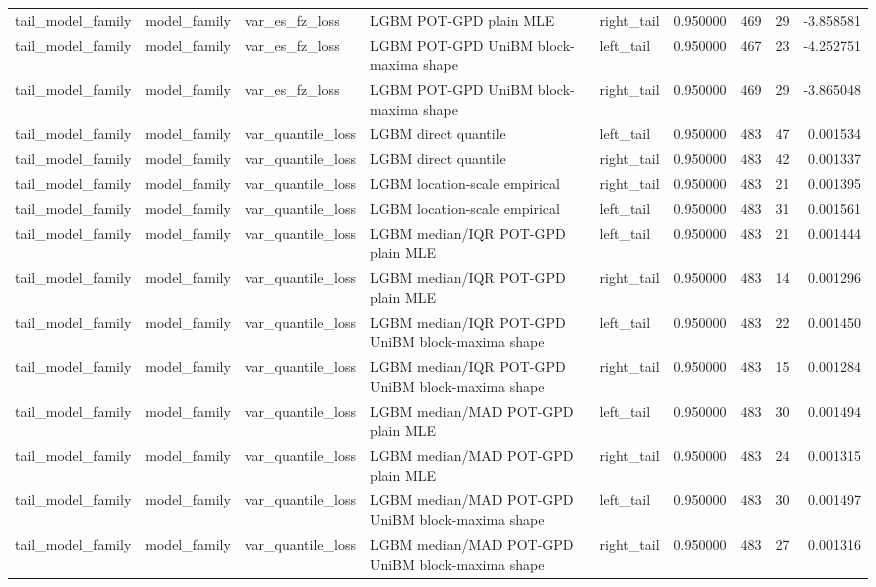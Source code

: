 \begin{tabular}{lllllrrrr}
tail\_model\_family & model\_family & var\_es\_fz\_loss & LGBM POT-GPD plain MLE & right\_tail & 0.950000 & 469 & 29 & -3.858581 \\
tail\_model\_family & model\_family & var\_es\_fz\_loss & LGBM POT-GPD UniBM block-maxima shape & left\_tail & 0.950000 & 467 & 23 & -4.252751 \\
tail\_model\_family & model\_family & var\_es\_fz\_loss & LGBM POT-GPD UniBM block-maxima shape & right\_tail & 0.950000 & 469 & 29 & -3.865048 \\
tail\_model\_family & model\_family & var\_quantile\_loss & LGBM direct quantile & left\_tail & 0.950000 & 483 & 47 & 0.001534 \\
tail\_model\_family & model\_family & var\_quantile\_loss & LGBM direct quantile & right\_tail & 0.950000 & 483 & 42 & 0.001337 \\
tail\_model\_family & model\_family & var\_quantile\_loss & LGBM location-scale empirical & right\_tail & 0.950000 & 483 & 21 & 0.001395 \\
tail\_model\_family & model\_family & var\_quantile\_loss & LGBM location-scale empirical & left\_tail & 0.950000 & 483 & 31 & 0.001561 \\
tail\_model\_family & model\_family & var\_quantile\_loss & LGBM median/IQR POT-GPD plain MLE & left\_tail & 0.950000 & 483 & 21 & 0.001444 \\
tail\_model\_family & model\_family & var\_quantile\_loss & LGBM median/IQR POT-GPD plain MLE & right\_tail & 0.950000 & 483 & 14 & 0.001296 \\
tail\_model\_family & model\_family & var\_quantile\_loss & LGBM median/IQR POT-GPD UniBM block-maxima shape & left\_tail & 0.950000 & 483 & 22 & 0.001450 \\
tail\_model\_family & model\_family & var\_quantile\_loss & LGBM median/IQR POT-GPD UniBM block-maxima shape & right\_tail & 0.950000 & 483 & 15 & 0.001284 \\
tail\_model\_family & model\_family & var\_quantile\_loss & LGBM median/MAD POT-GPD plain MLE & left\_tail & 0.950000 & 483 & 30 & 0.001494 \\
tail\_model\_family & model\_family & var\_quantile\_loss & LGBM median/MAD POT-GPD plain MLE & right\_tail & 0.950000 & 483 & 24 & 0.001315 \\
tail\_model\_family & model\_family & var\_quantile\_loss & LGBM median/MAD POT-GPD UniBM block-maxima shape & left\_tail & 0.950000 & 483 & 30 & 0.001497 \\
tail\_model\_family & model\_family & var\_quantile\_loss & LGBM median/MAD POT-GPD UniBM block-maxima shape & right\_tail & 0.950000 & 483 & 27 & 0.001316 \\

\end{tabular}

